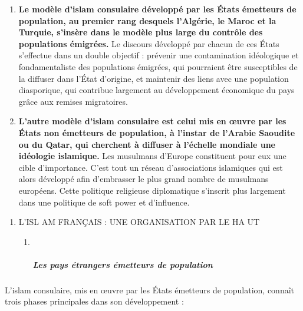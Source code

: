 \begin{enumerate}
\def\labelenumi{\alph{enumi}.}
\item
  
  \textbf{Le modèle d'islam consulaire développé par les États émetteurs
  de population, au premier rang desquels l'Algérie, le Maroc et la
  Turquie, s'insère dans le modèle plus large du contrôle des
  populations émigrées.} Le discours développé par chacun de ces États
  s'effectue dans un double objectif : prévenir une contamination
  idéologique et fondamentaliste des populations émigrées, qui
  pourraient être susceptibles de la diffuser dans l'État d'origine, et
  maintenir des liens avec une population diasporique, qui contribue
  largement au développement économique du pays grâce aux remises
  migratoires.
  
\item
  
  \textbf{L'autre modèle d'islam consulaire est celui mis en œuvre par
  les États non émetteurs de population, à l'instar de l'Arabie Saoudite
  ou du Qatar, qui cherchent à diffuser à l'échelle mondiale une
  idéologie islamique.} Les musulmans d'Europe constituent pour eux une
  cible d'importance. C'est tout un réseau d'associations islamiques qui
  est alors développé afin d'embrasser le plus grand nombre de musulmans
  européens. Cette politique religieuse diplomatique s'inscrit plus
  largement dans une politique de soft power et d'influence.
  
\end{enumerate}

\begin{enumerate}
\def\labelenumi{\Roman{enumi}.}
\setcounter{enumi}{1}
\item
  
  L'ISL AM FRANÇAIS : UNE ORGANISATION PAR LE HA UT
  

  \begin{enumerate}
  \def\labelenumii{\roman{enumii}.}
  \item ~
    \hypertarget{les-pays-uxe9trangers-uxe9metteurs-de-population}{%
    \subparagraph{Les pays étrangers émetteurs de
    population}\label{les-pays-uxe9trangers-uxe9metteurs-de-population}}
  \end{enumerate}
\end{enumerate}


L'islam consulaire, mis en œuvre par les États émetteurs de population,
connaît trois phases principales dans son développement :


